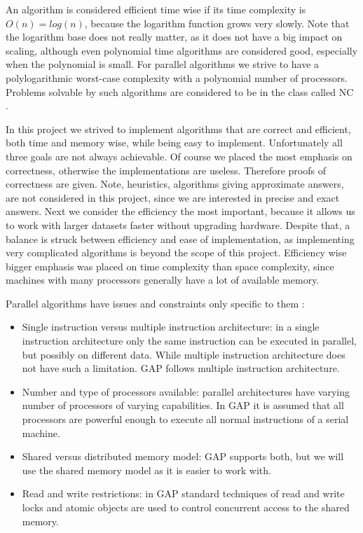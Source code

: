 \documentclass{report}
\theoremstyle{plain}
\theoremstyle{definition}
\theoremstyle{remark}
\numberwithin{definition}{chapter}
\numberwithin{example}{chapter}
\numberwithin{figure}{chapter}
\numberwithin{theorem}{chapter}
\numberwithin{lemma}{chapter}
\begin{document}
An algorithm is considered efficient time wise if its time complexity is $O(n)=log(n)$, because the logarithm function grows very slowly. Note that the logarithm base does not really matter, as it does not have a big impact on scaling, although even polynomial time algorithms are considered good, especially when the polynomial is small. For parallel algorithms we strive to have a polylogarithmic worst-case complexity with a polynomial number of processors. Problems solvable by such algorithms are considered to be in the class called NC \cite{berman1996fundamentals}.

In this project we strived to implement algorithms that are correct and efficient, both time and memory wise, while being easy to implement. Unfortunately all three goals are not always achievable. Of course we placed the most emphasis on correctness, otherwise the implementations are useless. Therefore proofs of correctness are given. Note, heuristics, algorithms giving approximate answers, are not considered in this project, since we are interested in precise and exact answers. Next we consider the efficiency the most important, because it allows us to work with larger datasets faster without upgrading hardware. Despite that, a balance is struck between efficiency and ease of implementation, as implementing very complicated algorithms is beyond the scope of this project. Efficiency wise bigger emphasis was placed on time complexity than space complexity, since machines with many processors generally have a lot of available memory.

Parallel algorithms have issues and constraints only specific to them \cite{berman1996fundamentals}:

\begin{itemize}
  \item Single instruction versus multiple instruction architecture: in a single instruction architecture only the same instruction can be executed in parallel, but possibly on different data. While multiple instruction architecture does not have such a limitation. GAP follows multiple instruction architecture.
  \item Number and type of processors available: parallel architectures have varying number of processors of varying capabilities. In GAP it is assumed that all processors are powerful enough to execute all normal instructions of a serial machine.
  \item Shared versus distributed memory model: GAP supports both, but we will use the shared memory model as it is easier to work with.
  \item Read and write restrictions: in GAP standard techniques of read and write locks and atomic objects are used to control concurrent access to the shared memory.
\end{itemize}
\end{document}
